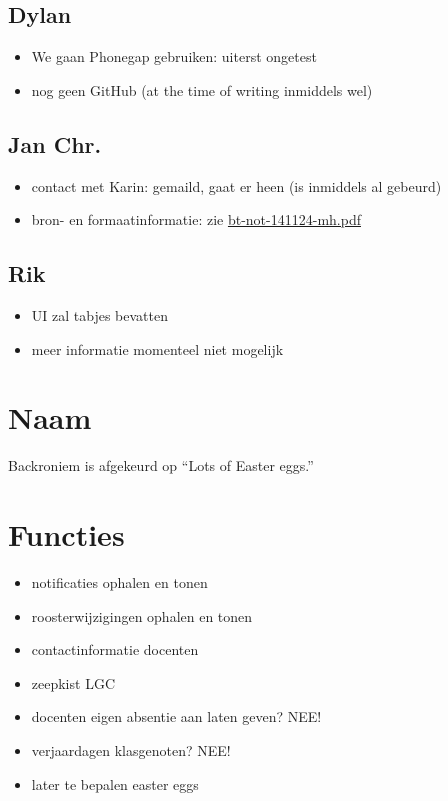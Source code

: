 \documentclass[a4paper, 10pt]{article}
\begin{document}
\subsection{Dylan}
\begin{itemize}
	\item We gaan Phonegap gebruiken: uiterst ongetest
	\item nog geen GitHub (at the time of writing inmiddels wel)
\end{itemize}

\subsection{Jan Chr.}
\begin{itemize}
	\item contact met Karin: gemaild, gaat er heen (is inmiddels al gebeurd)
	\item bron- en formaatinformatie: zie \url{bt-not-141124-mh.pdf}
\end{itemize}

\subsection{Rik}
\begin{itemize}
	\item UI zal tabjes bevatten
	\item meer informatie momenteel niet mogelijk
\end{itemize}

\section{Naam}
Backroniem is afgekeurd op ``Lots of Easter eggs.''

\section{Functies}
\begin{itemize}
	\item notificaties ophalen en tonen
	\item roosterwijzigingen ophalen en tonen
	\item contactinformatie docenten
	\item zeepkist LGC
	\item docenten eigen absentie aan laten geven? NEE!
	\item verjaardagen klasgenoten? NEE!
	\item later te bepalen easter eggs
\end{itemize}
\end{document}
